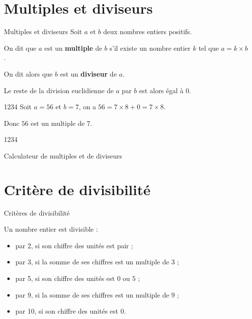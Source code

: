 \begin{pageCours}
\section{Multiples et diviseurs}

 
  

\begin{DefT}{Multiples et diviseurs}
 Soit $a$ et $b$ deux nombres entiers positifs. 
 
 On dit que $a$ est un \textbf{multiple} de $b$ s'il existe un nombre entier $k$ tel que $a = k \times b$.
 
 On dit alors que $b$ est un \textbf{diviseur} de $a$. 
\end{DefT}

\begin{Rq}

Le reste de la division euclidienne de $a$ par $b$ est alors égal à $0$. 
\end{Rq}


\begin{minipage}{0.6\linewidth}

\begin{ExQr}{1234}
Soit $a=56$ et $b=7$, on a $56 = 7 \times 8+0 = 7 \times 8$. 

Donc $56$ est un multiple de $7$.

\end{ExQr}
\end{minipage}
\begin{minipage}{0.4\linewidth}
\begin{OuQr}{1234}

 Calculateur de multiples et de diviseurs
\end{OuQr}
\end{minipage}
 
 
 
 
 
\section{Critère de divisibilité}



\begin{minipage}{0.6\linewidth}

\begin{ThT}{Critères de divisibilité}
 
Un nombre entier est divisible  :
 
\begin{itemize}
 \item par 2, si son chiffre des unités est pair ;
 \item par 3, si la somme de ses chiffres est un multiple de $3$ ;
 \item par 5, si  son chiffre des unités est $0$ ou $5$ ;
 \item par 9, si la somme de ses chiffres est un multiple de $9$ ;
 \item par 10, si  son chiffre des unités est $0$.
\end{itemize}
 

\end{ThT}
\end{minipage}
\end{pageCours}
